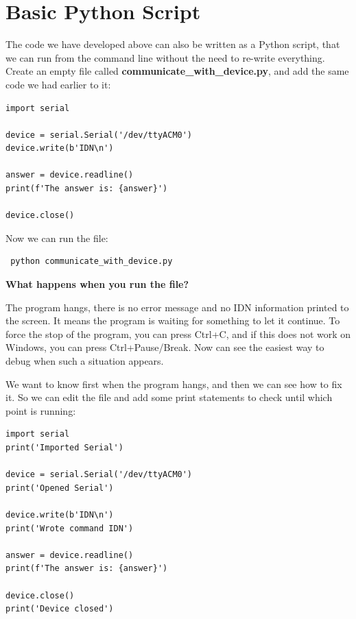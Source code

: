 \section{Basic Python Script}\label{sec:basic-python-script}
The code we have developed above can also be written as a Python script, that we can run from the command line without the need to re-write everything. Create an empty file called \textbf{communicate\_with\_device.py}, and add the same code we had earlier to it:

\begin{verbatim}
import serial

device = serial.Serial('/dev/ttyACM0')
device.write(b'IDN\n')

answer = device.readline()
print(f'The answer is: {answer}')

device.close()
\end{verbatim}

Now we can run the file:

\begin{verbatim}
 python communicate_with_device.py
\end{verbatim}


\textbf{What happens when you run the file?}

The program hangs, there is no error message and no IDN information printed to the screen. It means the program is waiting for something to let it continue. To force the stop of the program, you can press Ctrl+C, and if this does not work on Windows, you can press Ctrl+Pause/Break. Now can see the easiest way to debug when such a situation appears.

We want to know first when the program hangs, and then we can see how to fix it. So we can edit the file and add some print statements to check until which point is running:

\begin{verbatim}
import serial
print('Imported Serial')

device = serial.Serial('/dev/ttyACM0')
print('Opened Serial')

device.write(b'IDN\n')
print('Wrote command IDN')

answer = device.readline()
print(f'The answer is: {answer}')

device.close()
print('Device closed')
\end{verbatim}

